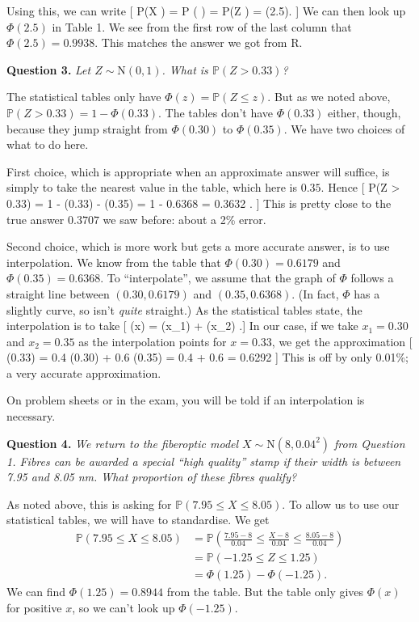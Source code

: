 \documentclass[
  letterpaper,
  DIV=11,
  numbers=noendperiod]{scrreprt}
\theoremstyle{remark}
\begin{document}
Using this, we can write {[} \mathbb P(X ) = \mathbb P
\left( \leq {}\right) = \mathbb P(Z
) = \Phi(2.5). {]} We can then look up \(\Phi(2.5)\) in Table 1.
We see from the first row of the last column that
\(\Phi(2.5) = 0.9938\). This matches the answer we got from R.

\textbf{Question 3.} \emph{Let \(Z \sim \mathrm{N}(0,1)\). What is
\(\mathbb P(Z > 0.33)\)?}

The statistical tables only have \(\Phi(z) = \mathbb P(Z \leq z)\). But
as we noted above, \(\mathbb P(Z > 0.33) = 1 - \Phi(0.33)\). The tables
don't have \(\Phi(0.33)\) either, though, because they jump straight
from \(\Phi(0.30)\) to \(\Phi(0.35)\). We have two choices of what to do
here.

First choice, which is appropriate when an approximate answer will
suffice, is simply to take the nearest value in the table, which here is
\(0.35\). Hence {[} \mathbb P(Z \textgreater{} 0.33) = 1 - \Phi(0.33)
 - \Phi(0.35) = 1 - 0.6368 = 0.3632 . {]} This is pretty close
to the true answer \(0.3707\) we saw before: about a 2\% error.

Second choice, which is more work but gets a more accurate answer, is to
use interpolation. We know from the table that \(\Phi(0.30) = 0.6179\)
and \(\Phi(0.35) = 0.6368\). To ``interpolate'', we assume that the
graph of \(\Phi\) follows a straight line between \((0.30, 0.6179)\) and
\((0.35, 0.6368)\). (In fact, \(\Phi\) has a slightly curve, so isn't
\emph{quite} straight.) As the statistical tables state, the
interpolation is to take {[} \Phi(x) = 
\Phi(x\_1) +  \Phi(x\_2) .{]} In our case, if
we take \(x_1 = 0.30\) and \(x_2 = 0.35\) as the interpolation points
for \(x = 0.33\), we get the approximation {[} \Phi(0.33) = 0.4
\Phi(0.30) + 0.6 \Phi(0.35) = 0.4 + 0.6  =
0.6292 {]} This is off by only 0.01\%; a very accurate approximation.

On problem sheets or in the exam, you will be told if an interpolation
is necessary.

\textbf{Question 4.} \emph{We return to the fiberoptic model
\(X \sim \mathrm{N}(8, 0.04^2)\) from Question 1. Fibres can be awarded
a special ``high quality'' stamp if their width is between 7.95 and 8.05
nm. What proportion of these fibres qualify?}

As noted above, this is asking for \(\mathbb P(7.95 \leq X \leq 8.05)\).
To allow us to use our statistical tables, we will have to standardise.
We get \begin{align*}
\mathbb P(7.95 \leq X \leq 8.05)
  &= \mathbb P \left(\frac{7.95 - 8}{0.04} \leq \frac{X - 8}{0.04} \leq \frac{8.05 - 8}{0.04}\right) \\
  &= \mathbb P(-1.25 \leq Z \leq 1.25) \\
  &= \Phi(1.25) - \Phi(-1.25) .
\end{align*} We can find \(\Phi(1.25) = 0.8944\) from the table. But the
table only gives \(\Phi(x)\) for positive \(x\), so we can't look up
\(\Phi(-1.25)\).
\end{document}
